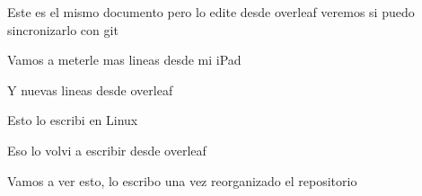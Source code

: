 \documentclass{article}
\begin{document}
	Este  es el mismo documento pero lo edite desde overleaf veremos si  puedo sincronizarlo con git
	
Vamos a meterle mas lineas desde mi iPad

Y nuevas lineas desde overleaf

Esto lo escribi en Linux


Eso lo volvi a escribir desde overleaf

Vamos a ver esto, lo escribo una vez reorganizado el repositorio



 
\end{document}
